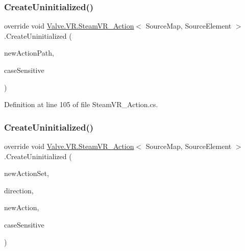 \subsubsection{\texorpdfstring{CreateUninitialized()}{CreateUninitialized()}\hspace{0.1cm}{\footnotesize\ttfamily [1/4]}}
{\footnotesize\ttfamily override void \mbox{\hyperlink{class_valve_1_1_v_r_1_1_steam_v_r___action}{Valve.\+V\+R.\+Steam\+V\+R\+\_\+\+Action}}$<$ Source\+Map, Source\+Element $>$.Create\+Uninitialized (\begin{DoxyParamCaption}\item[{string}]{new\+Action\+Path,  }\item[{bool}]{case\+Sensitive }\end{DoxyParamCaption})\hspace{0.3cm}{\ttfamily [protected]}}



Definition at line 105 of file Steam\+V\+R\+\_\+\+Action.\+cs.

\mbox{\label{class_valve_1_1_v_r_1_1_steam_v_r___action_a3ef78876da16318e17896536ae380e0a}} 
\subsubsection{\texorpdfstring{CreateUninitialized()}{CreateUninitialized()}\hspace{0.1cm}{\footnotesize\ttfamily [2/4]}}
{\footnotesize\ttfamily override void \mbox{\hyperlink{class_valve_1_1_v_r_1_1_steam_v_r___action}{Valve.\+V\+R.\+Steam\+V\+R\+\_\+\+Action}}$<$ Source\+Map, Source\+Element $>$.Create\+Uninitialized (\begin{DoxyParamCaption}\item[{string}]{new\+Action\+Set,  }\item[{\mbox{\hyperlink{namespace_valve_1_1_v_r_a1e6192cb5ddaf204afab87ccb5728780}{Steam\+V\+R\+\_\+\+Action\+Directions}}}]{direction,  }\item[{string}]{new\+Action,  }\item[{bool}]{case\+Sensitive }\end{DoxyParamCaption})\hspace{0.3cm}{\ttfamily [protected]}}



